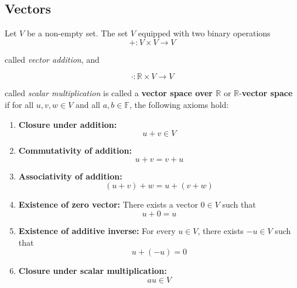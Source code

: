 \subsection{Vectors}
\begin{definition}
	Let $V$ be a non-empty set. The set $V$ equipped with two binary operations
	\[
		+: V \times V \rightarrow V
	\]

	called \textit{vector addition}, and

	\[
		\cdot : \mathbb{R} \times V \rightarrow V
	\]

	called \textit{scalar multiplication} is called a \textbf{vector space over \( \mathbb{R} \)} or \( \mathbb{R} \)-\textbf{vector space} if for all $u,v,w \in V$ and all $a,b \in \mathbb{F}$, the following axioms hold:

	\begin{enumerate}
		\item \textbf{Closure under addition:}
		      \begin{equation}
			      u+v \in V
			      \label{eq:r-vector-space-1}
		      \end{equation}

		\item \textbf{Commutativity of addition:}
		      \begin{equation}
			      u+v=v+u
			      \label{eq:r-vector-space-2}
		      \end{equation}

		\item \textbf{Associativity of addition:}
		      \begin{equation}
			      (u+v)+w=u+(v+w)
			      \label{eq:r-vector-space-3}
		      \end{equation}

		\item \textbf{Existence of zero vector:}
		      There exists a vector $0 \in V$ such that
		      \begin{equation}
			      u+0=u
			      \label{eq:r-vector-space-4}
		      \end{equation}

		\item \textbf{Existence of additive inverse:}
		      For every $u\in V$, there exists $-u\in V$ such that
		      \begin{equation}
			      u+(-u)=0
			      \label{eq:r-vector-space-5}
		      \end{equation}

		\item \textbf{Closure under scalar multiplication:}
		      \begin{equation}
			      au\in V
			      \label{eq:r-vector-space-6}
		      \end{equation}


\end{enumerate}
\end{definition}
